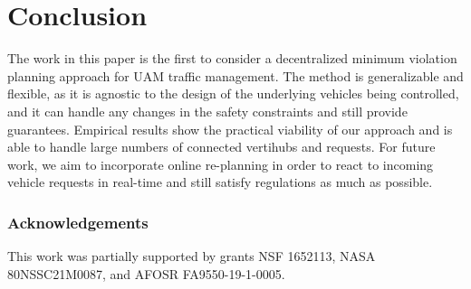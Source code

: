 \section{Conclusion} 
The work in this paper is the first to consider a decentralized minimum violation planning approach for UAM traffic management. The method is generalizable and flexible, as it is agnostic to the design of the underlying vehicles being controlled, and it can handle any changes in the safety constraints and still provide guarantees. Empirical results show the practical viability of our approach and is able to handle large numbers of connected vertihubs and requests. For future work, we aim to incorporate online re-planning in order to react to incoming vehicle requests in real-time and still satisfy regulations as much as possible. 

\subsubsection*{Acknowledgements}
This work was partially supported by grants NSF 1652113, NASA 80NSSC21M0087, and AFOSR FA9550-19-1-0005. 